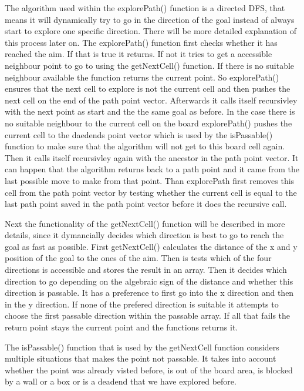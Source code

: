 \documentclass[a4paper,10pt]{article}
\begin{document}
	The algorithm used within the explorePath() function is a directed DFS, that means it will dynamically try to go in the 	direction of the goal instead of always start to explore one specific direction. There will be more detailed explanation of 		this process later on.
	The explorePath() function first checks whether it has reached the aim. If that is true it returns. If not it tries to get a 		accessible neighbour point to go to using the getNextCell() function. If there is no suitable neighbour available the 		function returns the current point. So explorePath() ensures that the next cell to explore is not the current cell and then 		pushes the next cell on the end of the path point vector. Afterwards it calls itself recursivley with the next point as start 		and the the same goal as before.
	In the case there is no suitable neighbour to the current cell on the board explorePath() pushes the current cell to the 		daedends point vector which is used by the isPassable() function to make sure that the algorithm will not get to this board 		cell again. Then it calls itself recursivley again with the ancestor in the path point vector. 
	It can happen that the algorithm returns back to a path point and it came from the last possible move to make from that 	point. Than explorePath first removes this cell from the path point vector by testing whether the current cell is equal to 		the last path point saved in the path point vector before it does the recursive call.

	Next the functionality of the getNextCell() function will be described in more details, since it dymancially decides which 		direction is best to go to reach the goal as fast as possible. First getNextCell() calculates the distance of the x and y 		position of the goal to the ones of the aim. Then is tests which of the four directions is accessible and stores the result 		in an array. Then it decides which direction to go depending on the algebraic sign of the distance and whether this direction 		is passable. It has a preference to first go into the x direction and then in the y direction. If none of the prefered 		direction is suitable it attempts to choose the first passable direction within the passable array. If all that fails the 		return point stays the current point and the functions returns it.

	The isPassable() function that is used by the getNextCell function considers multiple situations that makes the point not 		passable. It takes into account whether the point was already visted before, is out of the board area, is blocked by a wall 		or a box or is a deadend that we have explored before.
\end{document}
